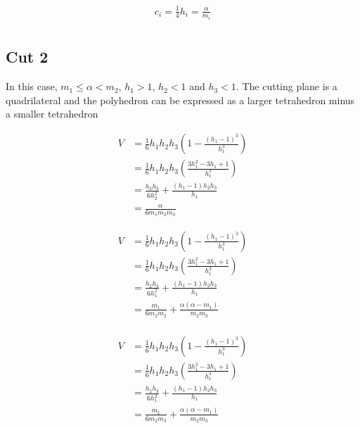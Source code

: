 \documentclass{article}
\begin{document}
\begin{equation}
\begin{aligned}
\label{eq:cut1}
  c_{i}= \frac{1}{4}h_{i} = \frac{\alpha}{m_{i}}\\
\end{aligned}
\end{equation}

\subsection{Cut 2}

In this case, $m_{1} \le \alpha < m_{2}$, $h_{1}>1$, $h_{2}<1$ and $h_{3}<1$.
The cutting  plane is a quadrilateral and the polyhedron can be expressed
as a larger tetrahedron minus a smaller tetrahedron

\begin{equation}
\begin{aligned}
\label{eq:cut1}
V &= \frac{1}{6}h_{1}h_{2}h_{3} \left ( 1 - \frac{(h_{1}-1)^{3}}{h_{1}^{3}} \right )\\
&= \frac{1}{6}h_{1}h_{2}h_{3} \left ( \frac{3h_{1}^{2} - 3h_{1} + 1}{h_{1}^{3}} \right )\\
& = \frac{h_{2}h_{3}}{6h_{2}^{2}} + \frac{(h_{1}-1)h_{2}h_{3}}{h_{1}}\\
& = \frac{\alpha}{6m_{1}m_{2}m_{3}}
\end{aligned}
\end{equation}

\begin{equation}
\begin{aligned}
\label{eq:cut1}
V &= \frac{1}{6}h_{1}h_{2}h_{3} \left ( 1 - \frac{(h_{1}-1)^{3}}{h_{1}^{3}} \right )\\
&= \frac{1}{6}h_{1}h_{2}h_{3} \left ( \frac{3h_{1}^{2} - 3h_{1} + 1}{h_{1}^{3}} \right )\\
& = \frac{h_{2}h_{3}}{6h_{1}^{2}} + \frac{(h_{1}-1)h_{2}h_{3}}{h_{1}}\\
& = \frac{m_{1}}{6m_{2}m_{3}} + \frac{\alpha(\alpha-m_{1})}{m_{2}m_{3}}\\
\end{aligned}
\end{equation}

\begin{equation}
\begin{aligned}
\label{eq:cut1}
V &= \frac{1}{6}h_{1}h_{2}h_{3} \left ( 1 - \frac{(h_{1}-1)^{3}}{h_{1}^{3}} \right )\\
&= \frac{1}{6}h_{1}h_{2}h_{3} \left( \frac{3h_{1}^{2} - 3h_{1} + 1}{h_{1}^{3}} \right )\\
& = \frac{h_{2}h_{3}}{6h_{1}^{2}} + \frac{(h_{1}-1)h_{2}h_{3}}{h_{1}}\\
& = \frac{m_{1}}{6m_{2}m_{3}} + \frac{\alpha(\alpha-m_{1})}{m_{2}m_{3}}\\
\end{aligned}
\end{equation}
\end{document}
